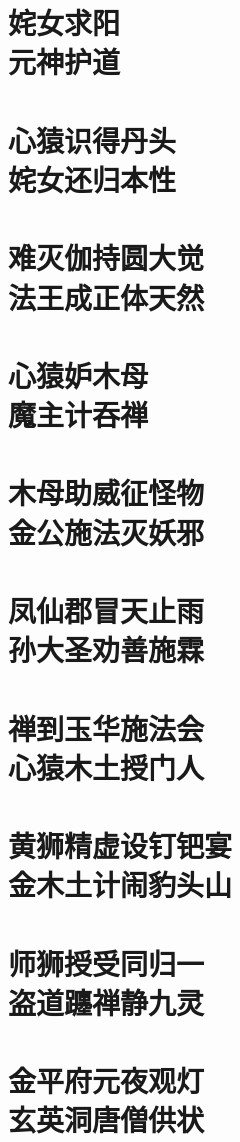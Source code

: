 \documentclass[12pt,UTF8]{ctexbook}
\begin{document}
{\chapter[姹女求阳\ 元神护道]{姹女求阳\\元神护道}
\chapter[心猿识得丹头\ 姹女还归本性]{心猿识得丹头\\姹女还归本性}
\chapter[难灭伽持圆大觉\ 法王成正体天然]{难灭伽持圆大觉\\法王成正体天然}
\chapter[心猿妒木母\ 魔主计吞禅]{心猿妒木母\\魔主计吞禅}
\chapter[木母助威征怪物\ 金公施法灭妖邪]{木母助威征怪物\\金公施法灭妖邪}
\chapter[凤仙郡冒天止雨\ 孙大圣劝善施霖]{凤仙郡冒天止雨\\孙大圣劝善施霖}
\chapter[禅到玉华施法会\ 心猿木土授门人]{禅到玉华施法会\\心猿木土授门人}
\chapter[黄狮精虚设钉钯宴\ 金木土计闹豹头山]{黄狮精虚设钉钯宴\\金木土计闹豹头山}
\chapter[师狮授受同归一\ 盗道躔禅静九灵]{师狮授受同归一\\盗道躔禅静九灵}
\chapter[金平府元夜观灯\ 玄英洞唐僧供状]{金平府元夜观灯\\玄英洞唐僧供状}
}
\end{document}
